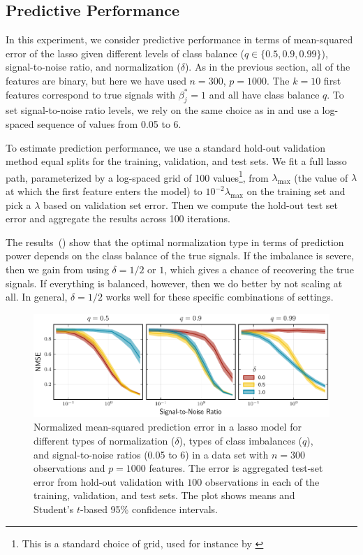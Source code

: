\subsection{Predictive Performance}\label{sec:predictive-performance}

In this experiment, we consider predictive performance in terms of mean-squared error of the lasso given different levels of class balance (\(q \in \{0.5, 0.9, 0.99\}\)), signal-to-noise ratio, and normalization (\(\delta\)). As in the previous section, all of the features are binary, but here we have used \(n=300\), \(p = \num{1000}\). The \(k=10\) first features correspond to true signals with \(\beta^*_j = 1\) and all have class balance \(q\). To set signal-to-noise ratio levels, we rely on the same choice as in \citet{hastie2020} and use a log-spaced sequence of values from 0.05 to 6.

To estimate prediction performance, we use a standard hold-out validation method equal splits for the training, validation, and test sets. We fit a full lasso path, parameterized by a log-spaced grid of 100 values\footnote{This is a standard choice of grid, used for instance by \citet{friedman2010}}, from \(\lambda_\text{max}\) (the value of \(\lambda\) at which the first feature enters the model) to \(10^{-2}\lambda_\text{max}\) on the training set and pick a \(\lambda\) based on validation set error. Then we compute the hold-out test set error and aggregate the results across 100 iterations.

The results~() show that the optimal normalization type in terms of prediction power depends on the class balance of the true signals. If the imbalance is severe, then we gain from using \(\delta=1/2\) or \(1\), which gives a chance of recovering the true signals. If everything is balanced, however, then we do better by not scaling at all. In general, \(\delta=1/2\) works well for these specific combinations of settings.

\begin{figure}[htpb]
  \centering
  \includegraphics[]{plots/binary_data_sim.pdf}
  \caption{%
    Normalized mean-squared prediction error in a lasso model for different types of normalization (\(\delta\)), types of class imbalances (\(q\)), and signal-to-noise ratios (0.05 to 6) in a data set with \(n=300\) observations and \(p = \num{1000}\) features. The error is aggregated test-set error from hold-out validation with \(100\) observations in each of the training, validation, and test sets. The plot shows means and Student's \(t\)-based 95\% confidence intervals.
  }
  \label{fig:binary-sim}
\end{figure}


